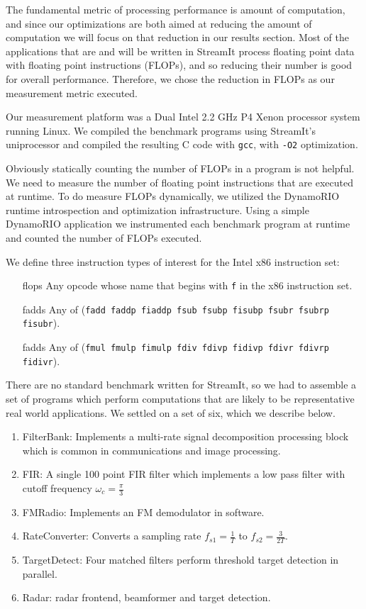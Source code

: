 The fundamental metric of processing performance is amount of computation, and since
our optimizations are both aimed at reducing the amount of computation we will focus 
on that reduction in our results section. Most of the applications that are and will
be written in StreamIt process floating point data with floating point instructions (FLOPs), 
and so reducing their number is good for overall performance. 
Therefore, we chose the reduction in FLOPs as our measurement metric executed.

Our measurement platform was a Dual Intel 2.2 GHz P4 Xenon processor system 
running Linux. We compiled the benchmark programs using StreamIt's uniprocessor
and compiled the resulting C code with {\tt gcc}, with {\tt -O2} optimization.

Obviously statically counting the number of FLOPs in a program is not helpful. We 
need to measure the number of floating point instructions that are executed at runtime.
To do measure FLOPs dynamically, we utilized the DynamoRIO\cite{rio-webpage}
runtime introspection and optimization infrastructure. Using a simple DynamoRIO application 
we instrumented each benchmark program at runtime and counted the number of FLOPs executed.


We define three instruction types of interest for the Intel x86 instruction set:
\begin{itemize}
\item[flops] Any opcode whose name that begins with {\tt f} in the x86 instruction set.
\item[fadds] Any of ({\tt fadd faddp fiaddp fsub fsubp fisubp fsubr fsubrp fisubr}).
\item[fadds] Any of ({\tt fmul fmulp fimulp fdiv fdivp fidivp fdivr fdivrp fidivr}).
\end{itemize}

There are no standard benchmark written for StreamIt, so we had to assemble
a set of programs which perform computations that are likely to be representative
real world applications. We settled on a set of six, which we describe below.

\begin{enumerate}
\item FilterBank: Implements a multi-rate signal decomposition processing block which is common in communications and image processing.
\item FIR: A single 100 point FIR filter which implements a low pass filter with cutoff frequency $\omega_c=\frac{\pi}{3}$
\item FMRadio: Implements an FM demodulator in software.
\item RateConverter: Converts a sampling rate $f_{s1}=\frac{1}{T}$ to $f_{s2}=\frac{3}{2T}$.
\item TargetDetect: Four matched filters perform threshold target detection in parallel.
\item Radar: radar frontend, beamformer and target detection.
\end{enumerate}


